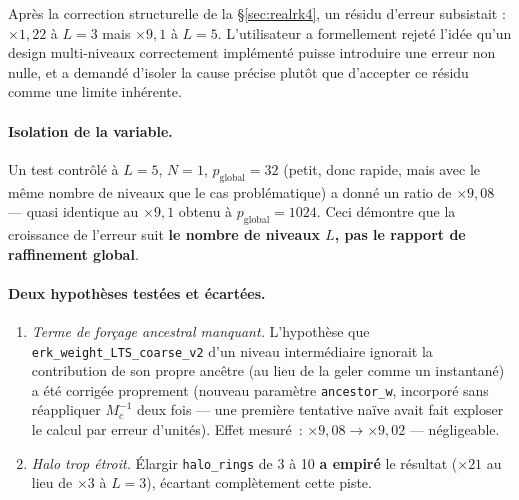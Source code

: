 \documentclass[11pt]{article}
\newcommand{\code}[1]{\texttt{#1}}
\begin{document}
Après la correction structurelle de la \S\ref{sec:realrk4}, un résidu
d'erreur subsistait : $\times 1{,}22$ à $L=3$ mais $\times 9{,}1$ à
$L=5$. L'utilisateur a formellement rejeté l'idée qu'un design
multi-niveaux correctement implémenté puisse introduire une erreur non
nulle, et a demandé d'isoler la cause précise plutôt que d'accepter ce
résidu comme une limite inhérente.

\paragraph{Isolation de la variable.} Un test contrôlé à $L=5$,
$N=1$, $p_{\text{global}}=32$ (petit, donc rapide, mais avec le même
nombre de niveaux que le cas problématique) a donné un ratio de
$\times 9{,}08$ --- quasi identique au $\times 9{,}1$ obtenu à
$p_{\text{global}}=1024$. Ceci démontre que la croissance de l'erreur
suit \textbf{le nombre de niveaux $L$, pas le rapport de raffinement
global}.

\paragraph{Deux hypothèses testées et écartées.}
\begin{enumerate}
  \item \emph{Terme de forçage ancestral manquant.} L'hypothèse que
  \code{erk\_weight\_LTS\_coarse\_v2} d'un niveau intermédiaire ignorait
  la contribution de son propre ancêtre (au lieu de la geler comme un
  instantané) a été corrigée proprement (nouveau paramètre
  \code{ancestor\_w}, incorporé sans réappliquer $M_c^{-1}$ deux fois ---
  une première tentative naïve avait fait exploser le calcul par erreur
  d'unités). Effet mesuré~: $\times 9{,}08 \to \times 9{,}02$ ---
  négligeable.
  \item \emph{Halo trop étroit.} Élargir \code{halo\_rings} de 3 à 10
  \textbf{a empiré} le résultat ($\times 21$ au lieu de $\times 3$ à
  $L=3$), écartant complètement cette piste.
\end{enumerate}
\end{document}
